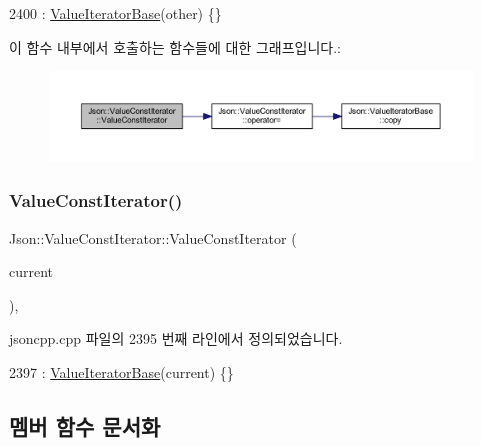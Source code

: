 \begin{DoxyCode}
2400     : \hyperlink{class_json_1_1_value_iterator_base_af45b028d9ff9cbd2554a87878b42dd75}{ValueIteratorBase}(other) \{\}
\end{DoxyCode}
이 함수 내부에서 호출하는 함수들에 대한 그래프입니다.\+:\nopagebreak
\begin{figure}[H]
\begin{center}
\leavevmode
\includegraphics[width=350pt]{class_json_1_1_value_const_iterator_a7ef3df204a9ae83a0d8a3cd128e05c70_cgraph}
\end{center}
\end{figure}
\mbox{\label{class_json_1_1_value_const_iterator_aa0a87edf5f1097f91dca5f2a389c4abd}} 
\subsubsection{\texorpdfstring{Value\+Const\+Iterator()}{ValueConstIterator()}\hspace{0.1cm}{\footnotesize\ttfamily [3/3]}}
{\footnotesize\ttfamily Json\+::\+Value\+Const\+Iterator\+::\+Value\+Const\+Iterator (\begin{DoxyParamCaption}\item[{const Value\+::\+Object\+Values\+::iterator \&}]{current }\end{DoxyParamCaption})\hspace{0.3cm}{\ttfamily [explicit]}, {\ttfamily [private]}}



jsoncpp.\+cpp 파일의 2395 번째 라인에서 정의되었습니다.


\begin{DoxyCode}
2397     : \hyperlink{class_json_1_1_value_iterator_base_af45b028d9ff9cbd2554a87878b42dd75}{ValueIteratorBase}(current) \{\}
\end{DoxyCode}


\subsection{멤버 함수 문서화}
\mbox{\label{class_json_1_1_value_iterator_base_af11473c9e20d07782e42b52a2f9e4540}} 

